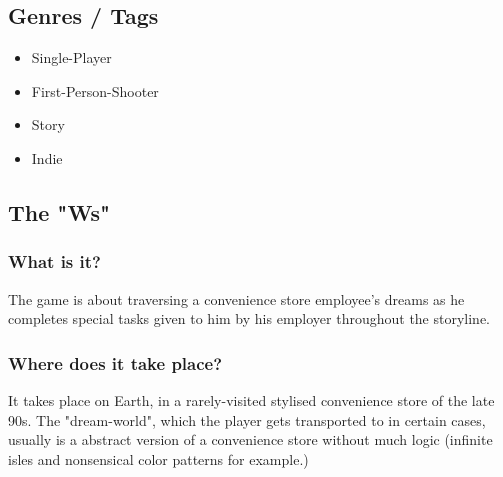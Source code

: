 \documentclass[10pt,a4paper]{article}
\begin{document}
\subsection{Genres / Tags}
\begin{itemize}
\item Single-Player
\item First-Person-Shooter
\item Story
\item Indie
\end{itemize}

\subsection{The "Ws"}
\subsubsection{What is it?}
The game is about traversing a convenience store employee's dreams as he completes special tasks given to him by his employer throughout the storyline.
\subsubsection{Where does it take place?}
It takes place on Earth, in a rarely-visited stylised convenience store of the late 90s. The "dream-world", which the player gets transported to in certain cases, usually is a abstract version of a convenience store without much logic (infinite isles and nonsensical color patterns for example.)
\end{document}
